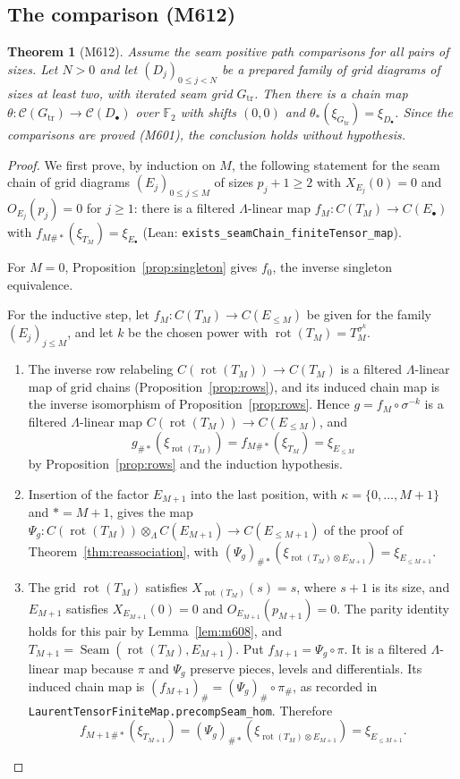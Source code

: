 \documentclass[11pt]{amsart}
\newtheorem{theorem}{Theorem}[section]
\theoremstyle{definition}
\theoremstyle{remark}
\newcommand{\lean}[1]{\textnormal{\nolinkurl{#1}}}
\newcommand{\Lam}{\Lambda}
\newcommand{\F}{\mathbb{F}_2}
\newcommand{\cC}{\mathcal{C}}
\newcommand{\rot}{\operatorname{rot}}
\DeclareMathOperator{\seam}{Seam}
\begin{document}
\subsection{The comparison (M612)}

\begin{theorem}[M612]\label{thm:iterated}
Assume the seam positive path comparisons for all pairs of sizes. Let $N>0$ and let
$(D_j)_{0\le j<N}$ be a prepared family of grid diagrams of sizes at least two, with iterated seam
grid $G_{\mathrm{tr}}$. Then there is a chain map $\theta\colon\cC(G_{\mathrm{tr}})\to\cC(D_\bullet)$
over $\F$ with shifts $(0,0)$ and $\theta_*(\xi_{G_{\mathrm{tr}}})=\xi_{D_\bullet}$. Since the
comparisons are proved (M601), the conclusion holds without hypothesis.
\end{theorem}

\begin{proof}
We first prove, by induction on $M$, the following statement for the seam chain of grid diagrams
$(E_j)_{0\le j\le M}$ of sizes $p_j+1\ge2$ with $X_{E_j}(0)=0$ and $O_{E_j}(p_j)=0$ for $j\ge1$:
there is a filtered $\Lam$-linear map $f_M\colon C(T_M)\to C(E_\bullet)$ with
$f_{M\#*}(\xi_{T_M})=\xi_{E_\bullet}$ (Lean: \lean{exists_seamChain_finiteTensor_map}).

For $M=0$, Proposition~\ref{prop:singleton} gives $f_0$, the inverse singleton equivalence.

For the inductive step, let $f_M\colon C(T_M)\to C(E_{\le M})$ be given for the family
$(E_j)_{j\le M}$, and let $k$ be the chosen power with $\rot(T_M)=T_M^{\sigma^k}$.
\begin{enumerate}
\item The inverse row relabeling $C(\rot(T_M))\to C(T_M)$ is a filtered $\Lam$-linear map of grid
chains (Proposition~\ref{prop:rows}), and its induced chain map is the inverse isomorphism of
Proposition~\ref{prop:rows}. Hence $g=f_M\circ\sigma^{-k}$ is a filtered $\Lam$-linear map
$C(\rot(T_M))\to C(E_{\le M})$, and
\[
g_{\#*}(\xi_{\rot(T_M)})=f_{M\#*}(\xi_{T_M})=\xi_{E_{\le M}}
\]
by Proposition~\ref{prop:rows} and the induction hypothesis.
\item Insertion of the factor $E_{M+1}$ into the last position, with $\kappa=\{0,\dots,M+1\}$ and
$*=M+1$, gives the map $\Psi_g\colon C(\rot(T_M))\otimes_\Lam C(E_{M+1})\to C(E_{\le M+1})$ of the
proof of Theorem~\ref{thm:reassociation}, with
$(\Psi_g)_{\#*}(\xi_{\rot(T_M)\otimes E_{M+1}})=\xi_{E_{\le M+1}}$.
\item The grid $\rot(T_M)$ satisfies $X_{\rot(T_M)}(s)=s$, where $s+1$ is its size, and $E_{M+1}$
satisfies $X_{E_{M+1}}(0)=0$ and $O_{E_{M+1}}(p_{M+1})=0$. The parity identity holds for this pair
by Lemma~\ref{lem:m608}, and $T_{M+1}=\seam(\rot(T_M),E_{M+1})$. Put $f_{M+1}=\Psi_g\circ\pi$. It is
a filtered $\Lam$-linear map because $\pi$ and $\Psi_g$ preserve pieces, levels and differentials.
Its induced chain map is $(f_{M+1})_\#=(\Psi_g)_\#\circ\pi_\#$, as recorded in
\lean{LaurentTensorFiniteMap.precompSeam_hom}. Therefore
\[
f_{M+1\,\#*}(\xi_{T_{M+1}})=(\Psi_g)_{\#*}(\xi_{\rot(T_M)\otimes E_{M+1}})=\xi_{E_{\le M+1}}.
\]
\end{enumerate}


\end{proof}
\end{document}
